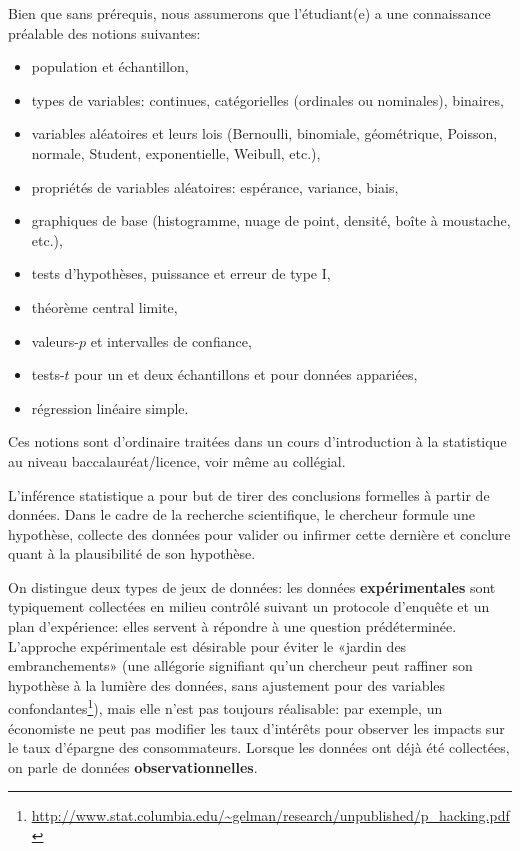 \documentclass[
  11pt,
  letterpaper,
]{book}
\providecommand{\tightlist}{%
  \setlength{\itemsep}{0pt}\setlength{\parskip}{0pt}}
\renewcommand{\href}[2]{#2\footnote{\url{#1}}}
\begin{document}
Bien que sans prérequis, nous assumerons que l'étudiant(e) a une connaissance préalable des notions suivantes:

\begin{itemize}
\tightlist
\item
  population et échantillon,
\item
  types de variables: continues, catégorielles (ordinales ou nominales), binaires,
\item
  variables aléatoires et leurs lois (Bernoulli, binomiale, géométrique, Poisson, normale, Student, exponentielle, Weibull, etc.),
\item
  propriétés de variables aléatoires: espérance, variance, biais,
\item
  graphiques de base (histogramme, nuage de point, densité, boîte à moustache, etc.),
\item
  tests d'hypothèses, puissance et erreur de type I,
\item
  théorème central limite,
\item
  valeurs-\(p\) et intervalles de confiance,
\item
  tests-\(t\) pour un et deux échantillons et pour données appariées,
\item
  régression linéaire simple.
\end{itemize}

Ces notions sont d'ordinaire traitées dans un cours d'introduction à la statistique au niveau baccalauréat/licence, voir même au collégial.

L'inférence statistique a pour but de tirer des conclusions formelles à partir de données. Dans le cadre de la recherche scientifique, le chercheur formule une hypothèse, collecte des données pour valider ou infirmer cette dernière et conclure quant à la plausibilité de son hypothèse.

On distingue deux types de jeux de données: les données \textbf{expérimentales} sont typiquement collectées en milieu contrôlé suivant un protocole d'enquête et un plan d'expérience: elles servent à répondre à une question prédéterminée. L'approche expérimentale est désirable pour éviter le «jardin des embranchements» (une \href{http://www.stat.columbia.edu/~gelman/research/unpublished/p_hacking.pdf}{allégorie signifiant qu'un chercheur peut raffiner son hypothèse à la lumière des données, sans ajustement pour des variables confondantes}), mais elle n'est pas toujours réalisable: par exemple, un économiste ne peut pas modifier les taux d'intérêts pour observer les impacts sur le taux d'épargne des consommateurs. Lorsque les données ont déjà été collectées, on parle de données \textbf{observationnelles}.
\end{document}
